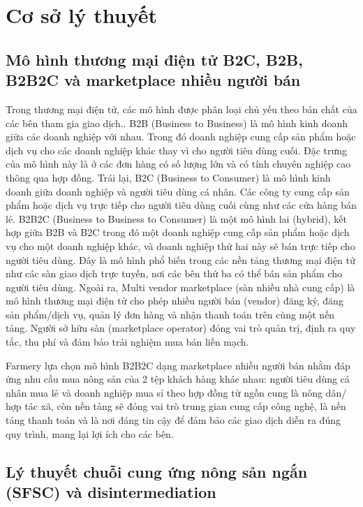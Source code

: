\section{Cơ sở lý thuyết}
\subsection{Mô hình thương mại điện tử B2C, B2B, B2B2C và marketplace nhiều người bán}


Trong thương mại điện tử, các mô hình được phân loại chủ yếu theo bản chất của các bên tham gia giao dịch.. B2B (Business to Business) là mô hình kinh doanh giữa các doanh nghiệp với nhau. Trong đó doanh nghiệp cung cấp sản phẩm hoặc dịch vụ cho các doanh nghiệp khác thay vì cho người tiêu dùng cuối. Đặc trưng của mô hình này là ở các đơn hàng có số lượng lớn và có tính chuyên nghiệp cao thông qua hợp đồng. Trái lại, B2C (Business to Consumer) là mô hình kinh doanh giữa doanh nghiệp và người tiêu dùng cá nhân. Các công ty cung cấp sản phẩm hoặc dịch vụ trực tiếp cho người tiêu dùng cuối cùng như các cửa hàng bán lẻ. B2B2C (Business to Business to Consumer) là một mô hình lai (hybrid), kết hợp giữa B2B và B2C trong đó một doanh nghiệp cung cấp sản phẩm hoặc dịch vụ cho một doanh nghiệp khác, và doanh nghiệp thứ hai này sẽ bán trực tiếp cho người tiêu dùng. Đây là mô hình phổ biến trong các nền tảng thương mại điện tử như các sàn giao dịch trực tuyến, nơi các bên thứ ba có thể bán sản phẩm cho người tiêu dùng. Ngoài ra, Multi vendor marketplace (sàn nhiều nhà cung cấp) là mô hình thương mại điện tử cho phép nhiều người bán (vendor) đăng ký, đăng sản phẩm/dịch vụ, quản lý đơn hàng và nhận thanh toán trên cùng một nền tảng. Người sở hữu sàn (marketplace operator) đóng vai trò quản trị, định ra quy tắc, thu phí và đảm bảo trải nghiệm mua bán liền mạch.


Farmery lựa chọn mô hình B2B2C dạng marketplace nhiều người bán nhằm đáp ứng nhu cầu mua nông sản của 2 tệp khách hàng khác nhau: người tiêu dùng cá nhân mua lẻ và doanh nghiệp mua sỉ theo hợp đồng từ ngồn cung là nông dân/ hợp tác xã, còn nền tảng sẽ đóng vai trò trung gian cung cấp công nghệ, là nền tảng thanh toán và là nơi đáng tin cậy để đảm bảo các giao dịch diễn ra đúng quy trình, mang lại lợi ích cho các bên.


\subsection{Lý thuyết chuỗi cung ứng nông sản ngắn (SFSC) và disintermediation}


